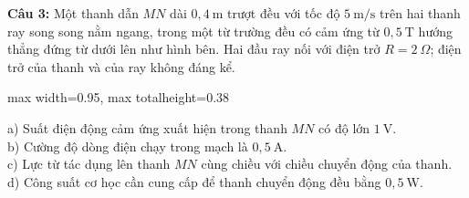 \documentclass[12pt,a4paper]{article}
\begin{document}
\begin{minipage}{\textwidth}
\noindent \textbf{Câu 3:} Một thanh dẫn $MN$ dài $0{,}4\ \text{m}$ trượt đều với tốc độ $5\ \text{m/s}$ trên hai thanh ray song song nằm ngang, trong một từ trường đều có cảm ứng từ $0{,}5\ \text{T}$ hướng thẳng đứng từ dưới lên như hình bên. Hai đầu ray nối với điện trở $R = 2\ \Omega$; điện trở của thanh và của ray không đáng kể.\\
\begin{center}
\begin{adjustbox}{max width=0.95\linewidth, max totalheight=0.38\textheight}
\end{adjustbox}
\end{center}
\noindent a) Suất điện động cảm ứng xuất hiện trong thanh $MN$ có độ lớn $1\ \text{V}$.\\

\noindent b) Cường độ dòng điện chạy trong mạch là $0{,}5\ \text{A}$.\\

\noindent c) Lực từ tác dụng lên thanh $MN$ cùng chiều với chiều chuyển động của thanh.\\

\noindent d) Công suất cơ học cần cung cấp để thanh chuyển động đều bằng $0{,}5\ \text{W}$.
\end{minipage}
\end{document}
